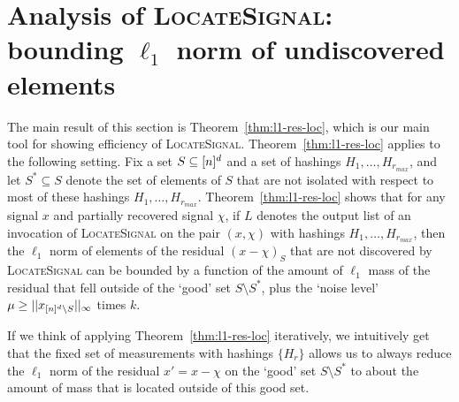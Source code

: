 \section{Analysis of \textsc{LocateSignal}: bounding $\ell_1$ norm of undiscovered elements}\label{sec:l1}

The main result of this section is Theorem~\ref{thm:l1-res-loc}, which is our main tool for showing efficiency of \textsc{LocateSignal}. Theorem~\ref{thm:l1-res-loc} applies to the following setting. Fix a set $S\subseteq {[n]^d}$ and a set of hashings $H_1,\ldots, H_{r_{max}}$, and let $S^*\subseteq S$ denote the set of elements of $S$ that are not isolated with respect to most of these hashings $H_1,\ldots, H_{r_{max}}$. Theorem~\ref{thm:l1-res-loc} shows that for any signal $x$ and partially recovered signal $\chi$, if $L$ denotes the output list of an invocation of \textsc{LocateSignal} on the pair $(x, \chi)$ with hashings $H_1,\ldots, H_{r_{max}}$, then 
the $\ell_1$ norm of elements of the residual $(x-\chi)_S$ that are not discovered by \textsc{LocateSignal} can be bounded by a function of the amount of $\ell_1$ mass of the residual that fell outside of the `good' set $S\setminus S^*$, plus the `noise level' $\mu\geq ||x_{{[n]^d}\setminus S}||_\infty$ times $k$.

If we think of applying Theorem~\ref{thm:l1-res-loc} iteratively, we intuitively get that the fixed set of measurements with hashings $\{H_r\}$ allows us to always reduce the $\ell_1$ norm of the residual $x'=x-\chi$ on the `good' set $S\setminus S^*$ to about the amount of mass that is located outside of this good set.




